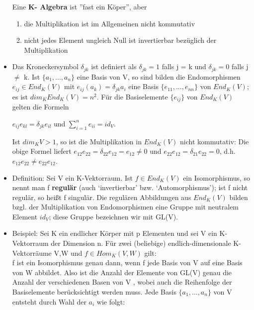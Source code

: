 \begin{itemize}
Eine \textbf{K- Algebra} ist ”fast ein Köper”, aber
\begin{enumerate}
\item die Multiplikation ist im Allgemeinen nicht kommutativ
\item nicht jedes Element ungleich Null ist invertierbar bezüglich der Multiplikation
\end{enumerate}
\item Das Kroneckersymbol $\delta_{jk}$ ist definiert als $\delta_{jk} = 1$ falls j = k und $\delta_{jk} = 0$ falls j $\neq$ k. Ist $\{a_1,... ,a_n\}$ eine Basis von V, so sind bilden die Endomorphismen $e_{ij} \in End_K (V)$ mit $e_{ij}(a_k) = \delta_{jk}a_i$ eine Basis $\{e_{11}, ..., e_{nn}\}$ von $End_K (V)$; es ist $dim_K End_K (V) = n^2$. Für die Basiselemente $\{e_{ij}\}$ von $End_K(V)$ gelten die Formeln
\begin{center}
$e_{ij}e_{kl} = \delta_{jk}e_{il}$ und $\sum\nolimits_{i=1}^{n}e_{ii} = id_V$.
\end{center}
Ist $dim_K V > 1$, so ist die Multiplikation in $End_K (V)$ nicht kommutativ: Die obige Formel liefert $e_{12}e_{22} = \delta_{22}e_{12} = e_{12} \neq 0$ und $e_{22}e_{12} = \delta_{21}e_{22} = 0$, d.h. $e_{12}e_{22} \neq e_{22}e_{12}$.
\item Definition: Sei V ein K-Vektorraum. Ist $f \in End_K(V)$ ein Isomorphismus, so nennt man f \textbf{regulär} (auch ‘invertierbar’ bzw. ‘Automorphismus’); ist f nicht regulär, so heißt f singulär. Die regulären Abbildungen aus $End_K (V)$ bilden bzgl. der Multiplikation von Endomorphismen eine Gruppe mit neutralem Element $id_V$; diese Gruppe bezeichnen wir mit GL(V).
\item Beispiel: Sei K ein endlicher Körper mit p Elementen und sei V ein K-Vektorraum der Dimension n. Für zwei (beliebige) endlich-dimensionale K-Vektorräume V,W und $f \in Hom_K(V,W)$ gilt: \\
f ist ein Isomorphismus genau dann, wenn f jede Basis von V auf eine Basis von W abbildet. Also ist die Anzahl der Elemente von GL(V) genau die Anzahl der verschiedenen Basen von V , wobei auch die Reihenfolge der Basiselemente berücksichtigt werden muss. Jede Basis $\{a_1, …, a_n\}$ von V entsteht durch Wahl der $a_i$ wie folgt:\\

\end{itemize}
